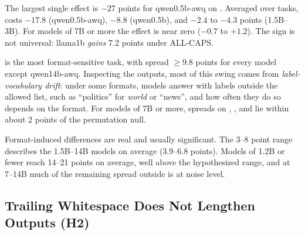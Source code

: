  The largest single effect is $-27$ points for qwen0.5b-awq on \sst. Averaged over tasks, \capsedit costs $-17.8$ (qwen0.5b-awq), $-8.8$ (qwen0.5b), and $-2.4$ to $-4.3$ points (\qwen 1.5B--3B). For models of 7B or more the effect is near zero ($-0.7$ to $+1.2$). The sign is not universal: llama1b \emph{gains} 7.2 points under ALL-CAPS.

 \agnews is the most format-sensitive task, with spread $\geq$9.8 points for every model except qwen14b-awq. Inspecting the outputs, most of this swing comes from \emph{label-vocabulary drift}: under some formats, models answer with labels outside the allowed list, such as ``politics'' for \emph{world} or ``news'', and how often they do so depends on the format. For models of 7B or more, spreads on \sst, \emotion, and \boolq lie within about 2 points of the permutation null.

 Format-induced differences are real and usually significant. The 3--8 point range describes the 1.5B--14B models on average (3.9--6.8 points). Models of 1.2B or fewer reach 14--21 points on average, well above the hypothesized range, and at 7--14B much of the remaining spread outside \agnews is at noise level.

\subsection{Trailing Whitespace Does Not Lengthen Outputs (H2)}
\label{sec:res_len}


